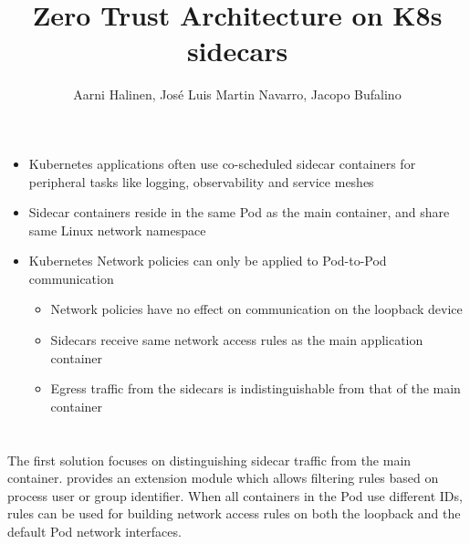 \documentclass[portrait,a1,final]{a0poster}
\begin{document}
\title{Zero Trust Architecture on K8s sidecars}
\author{Aarni Halinen, José Luis Martin Navarro, Jacopo Bufalino}

\makeheader

\begin{minipage}{\posterwidth}
  \begin{minipage}{\singlecolumnwidth}
    \section*{}
    \begin{itemize}
      \item Kubernetes applications often use co-scheduled sidecar containers for peripheral tasks like logging, observability and service meshes
      \item Sidecar containers reside in the same Pod as the main container, and share same Linux network namespace
      \item Kubernetes Network policies can only be applied to Pod-to-Pod communication
      \begin{itemize}
        \item Network policies have no effect on communication on the loopback device
        \item Sidecars receive same network access rules as the main application container
        \item Egress traffic from the sidecars is indistinguishable from that of the main container
      \end{itemize}
    \end{itemize}
  \end{minipage}

  \begin{minipage}[t]{\doublecolumnwidth}
    \vspace{\sectionspace}
    \section*{}

    The first solution focuses on distinguishing sidecar traffic from the main container.  provides an  extension module which allows filtering rules based on process user or group identifier. When all containers in the Pod use different IDs,  rules can be used for building network access rules on both the loopback and the default Pod network interfaces.


\end{minipage}
\end{minipage}
\end{document}
